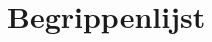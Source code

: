 \documentclass[a4paper, 11pt, oneside]{report}
\begin{document}

\tableofcontents
\clearpage


\chapter*{Begrippenlijst}
\label{inleiding:begrippenlijst}
\end{document}
